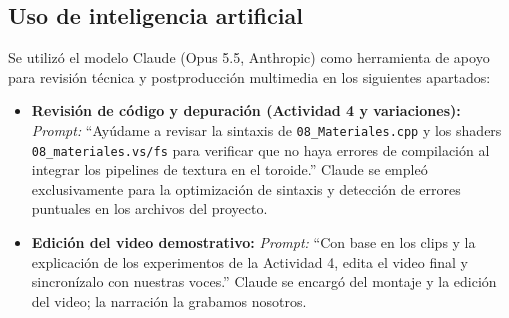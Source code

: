 \subsection*{Uso de inteligencia artificial}
\label{sec:uso_ia}

Se utilizó el modelo Claude (Opus 5.5, Anthropic) como herramienta de apoyo para revisión técnica y postproducción multimedia en los siguientes apartados:

\begin{itemize}
    \item \textbf{Revisión de código y depuración (Actividad 4 y variaciones):} \textit{Prompt:} ``Ayúdame a revisar la sintaxis de \texttt{08\_Materiales.cpp} y los shaders \texttt{08\_materiales.vs/fs} para verificar que no haya errores de compilación al integrar los pipelines de textura en el toroide.'' Claude se empleó exclusivamente para la optimización de sintaxis y detección de errores puntuales en los archivos del proyecto.
    
    \item \textbf{Edición del video demostrativo:} \textit{Prompt:} ``Con base en los clips y la explicación de los experimentos de la Actividad 4, edita el video final y sincronízalo con nuestras voces.'' Claude se encargó del montaje y la edición del video; la narración la grabamos nosotros.
\end{itemize}
